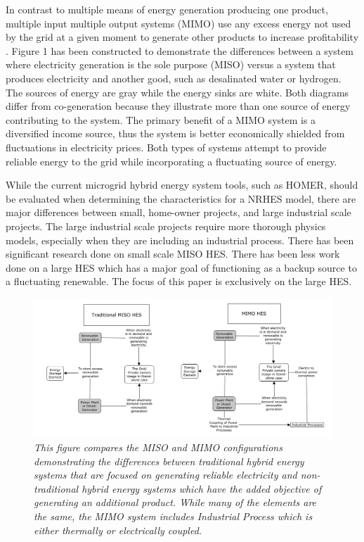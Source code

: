 \documentclass{article}                                                                           %
\begin{document}
\begin{linenumbers}
In contrast to multiple means of energy generation producing one product, multiple input multiple output systems (MIMO) use any excess energy not used by the grid at a given moment to generate other products to increase profitability \cite {Garcia2013}. Figure 1 has been constructed to demonstrate the differences between a system where electricity generation is the sole purpose (MISO) versus a system that produces electricity and another good, such as desalinated water or hydrogen. The sources of energy are gray while the energy sinks are white. Both diagrams differ from co-generation because they illustrate more than one source of energy contributing to the system. The primary benefit of a MIMO system is a diversified income source, thus the system is better economically shielded from fluctuations in electricity prices. Both types of systems attempt to provide reliable energy to the grid while incorporating a fluctuating source of energy.

 While the current microgrid hybrid energy system tools, such as HOMER, should be evaluated when determining the characteristics for a NRHES model, there are major differences between small, home-owner projects, and large industrial scale projects. The large industrial scale projects require more thorough physics models, especially when they are including an industrial process. There has been significant research done on small scale MISO HES.  There has been less work done on a large HES which has a major goal of functioning as a backup source to a fluctuating renewable. The focus of this paper is exclusively on the large HES.

\begin{figure}
\includegraphics[width=\textwidth]{MISO_MIMO.png}
\caption{\small \sl This figure compares the MISO and MIMO configurations demonstrating the differences between traditional hybrid energy systems that are focused on generating reliable electricity and non-traditional hybrid energy systems which have the added objective of generating an additional product.  While many of the elements are the same, the MIMO system includes  Industrial Process which is either thermally or electrically coupled.}
\end{figure}


\end{linenumbers}
\end{document}
